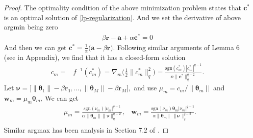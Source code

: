 \documentclass{article}
\newtheorem{lemma}{Lemma}
\begin{document}
\begin{proof}
The optimality condition of the above minimization problem \cite{rockafellar2015convex} states that $\pmb{c}^\ast$ is an optimal solution of \eqref{lp-regularization}. And we set the derivative of above argmin being zero
\begin{align}
    \label{l2-regularization-subgradient}
        \beta\mathbf{r}-\mathbf{a}+\alpha\pmb{c}^\ast=0
\end{align}
And then we can get $\pmb{c}^\ast=\frac{1}{\alpha}\Big(\mathbf{a}-\beta\mathbf{r}\Big)$.
Following similar arguments of Lemma 6 (see in Appendix), we find that it has a closed-form solution
\begin{align*}
    c_m=&f ^{-1}(c_m^\ast)=\nabla_m\Big(\frac{1}{2}\|{c}_m^\ast\|_q^2\Big)
    =\frac{\mathrm{sgn}({c}_m^\ast)|{c}_m^\ast|^{q-1}}{\alpha\|\pmb{c}^\ast\|_q^{q-2}}.
\end{align*}
Let
$
    \bm \nu=\Big[\|\pmb{\theta}_1\|-\beta\mathbf{r}_1,\ldots,
    \|\pmb{\theta}_M\|-\beta\mathbf{r}_M\Big],
$
and use $\mu_m=c_m/\|\pmb{\theta}_m\|$ and $\mathbf w_m=\mu_m\pmb{\theta}_m$, We can get
\begin{align*}
    &{\mu}_m=\frac{\mathrm{sgn}(\nu_m)|\nu_m|^{q-1}}{\alpha\|\pmb{\theta}_m\|\|\bm \nu\|_q^{q-2}},
    &\mathbf w_m=\frac{\mathrm{sgn}(\nu_m)\pmb{\theta}_m|\nu_m|^{q-1}}{\alpha\|\pmb{\theta}_m\|\|\bm \nu\|_q^{q-2}}.\\
\end{align*}
Similar argmax has been analysis in Section 7.2 of \cite{Xiao10}.
\end{proof}

\end{document}
